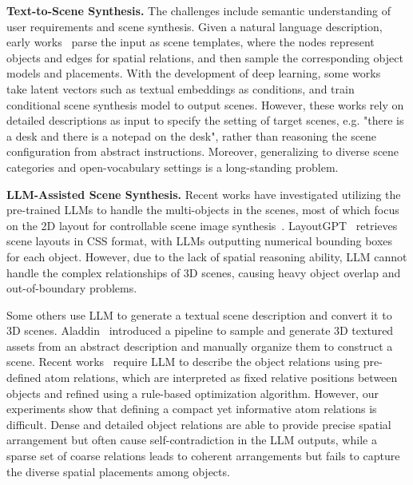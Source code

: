\noindent \textbf{Text-to-Scene Synthesis.} The challenges include semantic understanding of user requirements and scene synthesis. Given a natural language description, early works~\cite{ChangSM14, ChangMSPM15, ChangESM17, SavvaCA17, MaPFLPHYTGZ18, Yang2021} parse the input as scene templates, where the nodes represent objects and edges for spatial relations, and then sample the corresponding object models and placements. With the development of deep learning, some works~\cite{Paschalidou2021ATISSAT, Tang2023DiffuSceneSG, Dinh2024} take latent vectors such as textual embeddings as conditions, and train conditional scene synthesis model to output scenes. However, these works rely on detailed descriptions as input to specify the setting of target scenes, e.g. "there is a desk and there is a notepad on the desk", rather than reasoning the scene configuration from abstract instructions. Moreover, generalizing to diverse scene categories and open-vocabulary settings is a long-standing problem. 



\noindent \textbf{LLM-Assisted Scene Synthesis.} Recent works have investigated utilizing the pre-trained LLMs to handle the multi-objects in the scenes, most of which focus on the 2D layout for controllable scene image synthesis~\cite{lian2023llm, gani2023llm, nie2024compositional}. LayoutGPT~\cite{Feng2023LayoutGPTCV} retrieves scene layouts in CSS format, with LLMs outputting numerical bounding boxes for each object. However, due to the lack of spatial reasoning ability, LLM cannot handle the complex relationships of 3D scenes, causing heavy object overlap and out-of-boundary problems.

Some others use LLM to generate a textual scene description and convert it to 3D scenes. Aladdin~\cite{Huang2023AladdinZH} introduced a pipeline to sample and generate 3D textured assets from an abstract description and manually organize them to construct a scene. Recent works~\cite{Wen2023AnyHomeOG, Yang2023HolodeckLG} require LLM to describe the object relations using pre-defined atom relations, which are interpreted as fixed relative positions between objects and refined using a rule-based optimization algorithm. However, our experiments show that defining a compact yet informative atom relations is difficult. Dense and detailed object relations are able to provide precise spatial arrangement but often cause self-contradiction in the LLM outputs, while a sparse set of coarse relations leads to coherent arrangements but fails to capture the diverse spatial placements among objects. 
